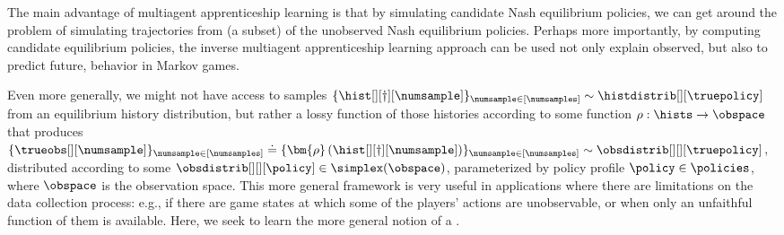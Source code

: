 



The main advantage of multiagent apprenticeship learning is that by simulating candidate Nash equilibrium policies, we can get around the problem of simulating trajectories from (a subset) of the unobserved Nash equilibrium policies.
Perhaps more importantly, by computing candidate equilibrium policies, the inverse multiagent apprenticeship learning approach can be used not only explain observed, but also to predict future, behavior in Markov games.
\fi

Even more generally, we might not have access to samples $\{ \hist[][\dagger][\numsample]\}_{\numsample \in [\numsamples]} \sim \histdistrib[][\truepolicy]$ from an equilibrium history distribution, but rather a lossy function of those histories according to some function $\rho: \hists \to \obspace$ that produces  $\{ \trueobs[][\numsample] \}_{\numsample \in [\numsamples]} \doteq \{ \bm{\rho} \left(\hist[][\dagger][\numsample]\right)\}_{\numsample \in [\numsamples]} \sim \obsdistrib[][][\truepolicy]$, distributed according to some  
$\obsdistrib[][][{\policy}] \in \simplex(\obspace)$, parameterized by policy profile $\policy \in \policies$, where $\obspace$ is the observation space.
This more general framework is very useful in applications where there are limitations on the data collection process: e.g., if there are game states at which some of the players' actions are unobservable, or when only an unfaithful function of them is available.
Here, we seek to learn the more general notion of a .

